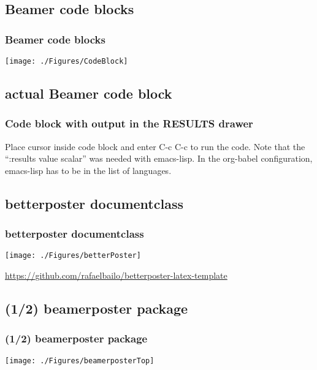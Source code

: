 \documentclass{beamer}
\begin{document}
\subsection{Beamer code blocks}
\begin{frame}
\frametitle{Beamer code blocks}
\begin{center}
    \texttt{[image: ./Figures/CodeBlock]}
\end{center}
\end{frame}
\note{}

\subsection{actual Beamer code block}
\begin{frame}
\frametitle{Code block with output in the RESULTS drawer}
Place cursor inside code block and enter C-c C-c to run the code.
\exampleCodeC
Note that the ``:results value scalar'' was needed with emacs-lisp.
In the org-babel configuration, emacs-lisp has to be in the list of languages.
\end{frame}

\subsection{betterposter documentclass}
\begin{frame}
\frametitle{betterposter documentclass}
\begin{center}
    \texttt{[image: ./Figures/betterPoster]}
\end{center}
\footnotesize{\url{https://github.com/rafaelbailo/betterposter-latex-template}}
\end{frame}
\note{}

\subsection{(1/2) beamerposter package}
\begin{frame}
\frametitle{ (1/2) beamerposter package}
\begin{center}
    \texttt{[image: ./Figures/beamerposterTop]}
\end{center}
\end{frame}
\end{document}
